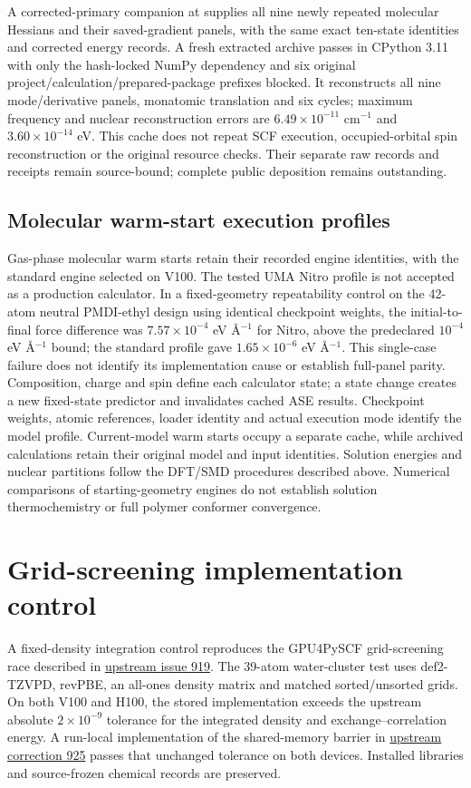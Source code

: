 \documentclass[11pt]{article}
\begin{document}
A corrected-primary companion at  supplies all nine newly repeated molecular Hessians and their saved-gradient panels, with the same exact ten-state identities and corrected energy records. A fresh extracted archive passes in CPython 3.11 with only the hash-locked NumPy dependency and six original project/calculation/prepared-package prefixes blocked. It reconstructs all nine mode/derivative panels, monatomic translation and six cycles; maximum frequency and nuclear reconstruction errors are $6.49\times10^{-11}$ cm$^{-1}$ and $3.60\times10^{-14}$ eV. This cache does not repeat SCF execution, occupied-orbital spin reconstruction or the original resource checks. Their separate raw records and receipts remain source-bound; complete public deposition remains outstanding.

\subsection{Molecular warm-start execution profiles}
Gas-phase molecular warm starts retain their recorded engine identities, with the standard engine selected on V100. The tested UMA Nitro profile is not accepted as a production calculator. In a fixed-geometry repeatability control on the 42-atom neutral PMDI-ethyl design using identical checkpoint weights, the initial-to-final force difference was $7.57\times10^{-4}$ eV \AA$^{-1}$ for Nitro, above the predeclared $10^{-4}$ eV \AA$^{-1}$ bound; the standard profile gave $1.65\times10^{-6}$ eV \AA$^{-1}$. This single-case failure does not identify its implementation cause or establish full-panel parity.\cite{fairchemInference2026} Composition, charge and spin define each calculator state; a state change creates a new fixed-state predictor and invalidates cached ASE results. Checkpoint weights, atomic references, loader identity and actual execution mode identify the model profile. Current-model warm starts occupy a separate cache, while archived calculations retain their original model and input identities. Solution energies and nuclear partitions follow the DFT/SMD procedures described above. Numerical comparisons of starting-geometry engines do not establish solution thermochemistry or full polymer conformer convergence.

\section{Grid-screening implementation control}
A fixed-density integration control reproduces the GPU4PySCF grid-screening race described in \href{https://github.com/pyscf/gpu4pyscf/issues/919}{upstream issue 919}. The 39-atom water-cluster test uses def2-TZVPD, revPBE, an all-ones density matrix and matched sorted/unsorted grids. On both V100 and H100, the stored implementation exceeds the upstream absolute $2\times10^{-9}$ tolerance for the integrated density and exchange--correlation energy. A run-local implementation of the shared-memory barrier in \href{https://github.com/pyscf/gpu4pyscf/pull/925}{upstream correction 925} passes that unchanged tolerance on both devices. Installed libraries and source-frozen chemical records are preserved.
\end{document}
